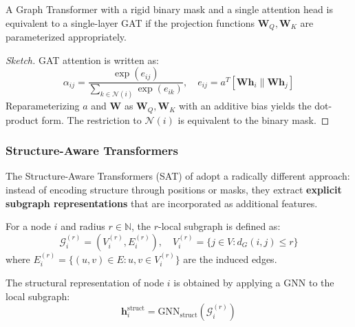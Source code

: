 \begin{theorem}\label{thm:gat_graphtransformer_equivalence}
A Graph \gls{Transformer} with a rigid binary mask and a single attention head is equivalent to a single-layer \gls{GAT} if the projection functions $\mathbf{W}_Q, \mathbf{W}_K$ are parameterized appropriately.
\end{theorem}

\begin{proof}[Sketch]
\gls{GAT} attention is written as:
\begin{equation}
    \alpha_{ij} = \frac{\exp(e_{ij})}{\sum_{k \in \mathcal{N}(i)} \exp(e_{ik})}, \quad e_{ij} = a^T[\mathbf{W}\mathbf{h}_i \| \mathbf{W}\mathbf{h}_j]
\end{equation}
Reparameterizing $a$ and $\mathbf{W}$ as $\mathbf{W}_Q, \mathbf{W}_K$ with an additive bias yields the dot-product form. The restriction to $\mathcal{N}(i)$ is equivalent to the binary mask.
\end{proof}

\subsubsection[Structure-Aware Transformers]{Structure-Aware \glspl{Transformer}}\label{subsubsec:structure_aware_transformers}

The Structure-Aware \glspl{Transformer} (SAT) of \citet{chen2022structureaware} adopt a radically different approach: instead of encoding structure through positions or masks, they extract \textbf{explicit subgraph representations} that are incorporated as additional features.

\begin{definition}\label{def:subgraph_representation_sat}
For a node $i$ and radius $r \in \mathbb{N}$, the $r$-local subgraph is defined as:
\begin{equation}
    \mathcal{G}_i^{(r)} = (V_i^{(r)}, E_i^{(r)}), \quad V_i^{(r)} = \{j \in V : d_G(i,j) \leq r\}
    \label{eq:local_subgraph}
\end{equation}
where $E_i^{(r)} = \{(u,v) \in E : u, v \in V_i^{(r)}\}$ are the induced edges.

The structural representation of node $i$ is obtained by applying a \gls{GNN} to the local subgraph:
\begin{equation}
    \mathbf{h}_i^{\text{struct}} = \text{GNN}_{\text{struct}}(\mathcal{G}_i^{(r)})
    \label{eq:structural_representation_sat}
\end{equation}
\end{definition}

